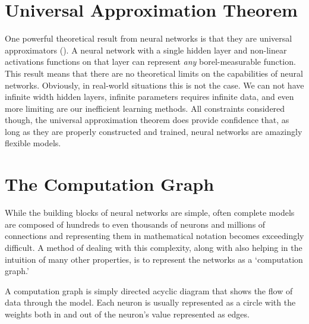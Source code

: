 \documentclass[]{book}
\theoremstyle{definition}
\theoremstyle{definition}
\theoremstyle{definition}
\theoremstyle{remark}
\begin{document}
\section{Universal Approximation
Theorem}\label{universal-approximation-theorem}

One powerful theoretical result from neural networks is that they are
universal approximators (\citet{universal_approximators}). A neural
network with a single hidden layer and non-linear activations functions
on that layer can represent \emph{any} borel-measurable function. This
result means that there are no theoretical limits on the capabilities of
neural networks. Obviously, in real-world situations this is not the
case. We can not have infinite width hidden layers, infinite parameters
requires infinite data, and even more limiting are our inefficient
learning methods. All constraints considered though, the universal
approximation theorem does provide confidence that, as long as they are
properly constructed and trained, neural networks are amazingly flexible
models.

\section{The Computation Graph}\label{the-computation-graph}

While the building blocks of neural networks are simple, often complete
models are composed of hundreds to even thousands of neurons and
millions of connections and representing them in mathematical notation
becomes exceedingly difficult. A method of dealing with this complexity,
along with also helping in the intuition of many other properties, is to
represent the networks as a `computation graph.'

A computation graph is simply directed acyclic diagram that shows the
flow of data through the model. Each neuron is usually represented as a
circle with the weights both in and out of the neuron's value
represented as edges.
\end{document}
